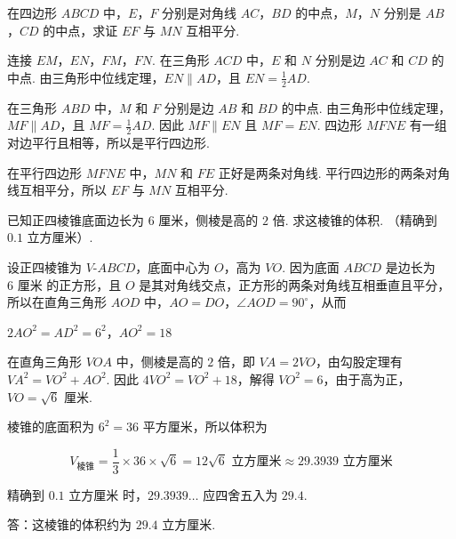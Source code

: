 \begin{problem}
在四边形 \(ABCD\) 中，\(E\)，\(F\) 分别是对角线 \(AC\)，\(BD\) 的中点，\(M\)，\(N\) 分别是 \(AB\)，\(CD\) 的中点，求证 \(EF\) 与 \(MN\) 互相平分.

\end{problem}

\begin{solution}
连接 \(EM\)，\(EN\)，\(FM\)，\(FN\). 在三角形 \(ACD\) 中，\(E\) 和 \(N\) 分别是边 \(AC\) 和 \(CD\) 的中点. 由三角形中位线定理，\(EN\parallel AD\)，且 \(EN=\frac{1}{2}AD\).

在三角形 \(ABD\) 中，\(M\) 和 \(F\) 分别是边 \(AB\) 和 \(BD\) 的中点. 由三角形中位线定理，\(MF\parallel AD\)，且 \(MF=\frac{1}{2}AD\). 因此 \(MF\parallel EN\) 且 \(MF=EN\). 四边形 \(MFNE\) 有一组对边平行且相等，所以是平行四边形.

在平行四边形 \(MFNE\) 中，\(MN\) 和 \(FE\) 正好是两条对角线. 平行四边形的两条对角线互相平分，所以 \(EF\) 与 \(MN\) 互相平分.
\end{solution}

\begin{problem}
已知正四棱锥底面边长为 \(6\text{ 厘米}\)，侧棱是高的 \(2\) 倍. 求这棱锥的体积. （精确到 \(0.1\text{ 立方厘米}\)）.

\end{problem}

\begin{solution}
设正四棱锥为 \(V\text{-}ABCD\)，底面中心为 \(O\)，高为 \(VO\). 因为底面 \(ABCD\) 是边长为 \(6\text{ 厘米}\) 的正方形，且 \(O\) 是其对角线交点，正方形的两条对角线互相垂直且平分，所以在直角三角形 \(AOD\) 中，\(AO=DO\)，\(\angle AOD=90^\circ\)，从而

\(2AO^2=AD^2=6^2\)，\(AO^2=18\)

在直角三角形 \(VOA\) 中，侧棱是高的 \(2\) 倍，即 \(VA=2VO\)，由勾股定理有 \(VA^2=VO^2+AO^2\). 因此 \(4VO^2=VO^2+18\)，解得 \(VO^2=6\)，由于高为正，\(VO=\sqrt{6}\text{ 厘米}\).

棱锥的底面积为 \(6^2=36\text{ 平方厘米}\)，所以体积为

\[
V_{\text{棱锥}}=\frac{1}{3}\times36\times\sqrt{6}=12\sqrt{6}\text{ 立方厘米}\approx29.3939\text{ 立方厘米}
\]

精确到 \(0.1\text{ 立方厘米}\) 时，\(29.3939\ldots\) 应四舍五入为 \(29.4\).

答：这棱锥的体积约为 \(29.4\text{ 立方厘米}\).
\end{solution}

